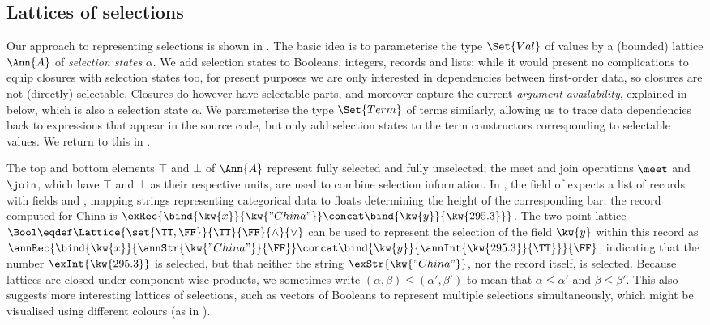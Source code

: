 \subsection{Lattices of selections}
\label{sec:data-dependencies:lattices-of-selections}

Our approach to representing selections is shown in . The basic idea is to parameterise the type $\Set{Val}$ of values by a (bounded) lattice $\Ann{A}$ of \emph{selection states} $\alpha$. We add selection states to Booleans, integers, records and lists; while it would present no complications to equip closures with selection states too, for present purposes we are only interested in dependencies between first-order data, so closures are not (directly) selectable. Closures do however have selectable parts, and moreover capture the current \emph{argument availability}, explained in  below, which is also a selection state $\alpha$. We parameterise the type $\Set{Term}$ of terms similarly, allowing us to trace data dependencies back to expressions that appear in the source code, but only add selection states to the term constructors corresponding to selectable values. We return to this in .



The top and bottom elements $\top$ and $\bot$ of $\Ann{A}$ represent fully selected and fully unselected; the meet and join operations $\meet$ and $\join$, which have $\top$ and $\bot$ as their respective units, are used to combine selection information. In , the  field of  expects a list of records with fields  and , mapping strings representing categorical data to floats determining the height of the corresponding bar; the record computed for China is $\exRec{\bind{\kw{x}}{\kw{"China"}} \concat \bind{\kw{y}}{\kw{295.3}}}$. The two-point lattice $\Bool \eqdef \Lattice{\set{\TT,\FF}}{\TT}{\FF}{\wedge}{\vee}$ can be used to represent the selection of the field $\kw{y}$ within this record as $\annRec{\bind{\kw{x}}{\annStr{\kw{"China"}}{\FF}} \concat \bind{\kw{y}}{\annInt{\kw{295.3}}{\TT}}}{\FF}$, indicating that the number $\exInt{\kw{295.3}}$ is selected, but that neither the string $\exStr{\kw{"China"}}$, nor the record itself, is selected. Because lattices are closed under component-wise products, we sometimes write $(\alpha, \beta) \leq (\alpha', \beta')$ to mean that $\alpha \leq \alpha'$ and $\beta \leq \beta'$. This also suggests more interesting lattices of selections, such as vectors of Booleans to represent multiple selections simultaneously, which might be visualised using different colours (as in ).


